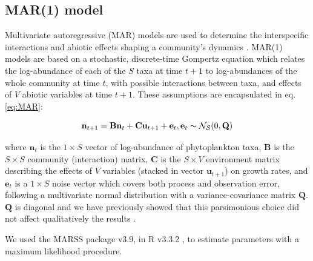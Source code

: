 \documentclass[10pt]{article}
\begin{document}
\subsection*{MAR(1) model}

Multivariate autoregressive (MAR) models are used to determine the
interspecific interactions and abiotic effects shaping a community's
dynamics \citep{ives_estimating_2003}. MAR(1) models are based on
a stochastic, discrete-time Gompertz equation which relates the log-abundance
of each of the $S$ taxa at time $t+1$ to log-abundances of the whole
community at time $t$, with possible interactions between taxa, and
effects of $V$ abiotic variables at time $t+1$. These assumptions
are encapsulated in eq. \ref{eq:MAR}:

\begin{equation}
\mathbf{n}_{t+1}=\mathbf{B}\mathbf{n}_{t}+\textbf{C}\textbf{u}_{t+1}+\mathbf{e}_{t},\mathbf{e}_{t}\thicksim\mathcal{{N_{S}}}(0,\mathbf{Q})\label{eq:MAR}
\end{equation}

where $\mathbf{n}_{\ensuremath{t}}$ is the $1\times S$ vector of
log-abundance of phytoplankton taxa, $\mathbf{B}$ is the $S\times S$
community (interaction) matrix, $\mathbf{C}$ is the $S\times V$
environment matrix describing the effects of $V$ variables (stacked
in vector $\mathbf{u}_{t+1}$) on growth
rates, and $\mathbf{e}_{t}$ is a $1\times S$ noise vector which
covers both process and observation error, following a multivariate
normal distribution with a variance-covariance matrix $\mathbf{Q}$.
$\mathbf{Q}$ is diagonal and we have previously showed that this
parsimonious choice did not affect qualitatively the results \citep{barraquand_coastal_2018}.

We used the MARSS package \citep{holmes_analysis_2014} v3.9, in R
v3.3.2 \citep{venables_r_2013}, to estimate parameters with a maximum
likelihood procedure.
\end{document}
